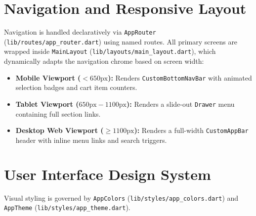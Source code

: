 \documentclass[11pt,a4paper]{article}
\begin{document}
\FloatBarrier

\section{Navigation and Responsive Layout}

Navigation is handled declaratively via \texttt{AppRouter} (\texttt{lib/\allowbreak routes/\allowbreak app\_router.dart}) using named routes. All primary screens are wrapped inside \texttt{MainLayout} (\texttt{lib/\allowbreak layouts/\allowbreak main\_layout.dart}), which dynamically adapts the navigation chrome based on screen width:

\begin{itemize}[leftmargin=*]
    \item \textbf{Mobile Viewport ($< 650\text{px}$):} Renders \texttt{CustomBottomNavBar} with animated selection badges and cart item counters.
    \item \textbf{Tablet Viewport ($650\text{px} - 1100\text{px}$):} Renders a slide-out \texttt{Drawer} menu containing full section links.
    \item \textbf{Desktop Web Viewport ($\ge 1100\text{px}$):} Renders a full-width \texttt{CustomAppBar} header with inline menu links and search triggers.
\end{itemize}

\FloatBarrier

\section{User Interface Design System}

Visual styling is governed by \texttt{AppColors} (\texttt{lib/\allowbreak styles/\allowbreak app\_colors.dart}) and \texttt{AppTheme} (\texttt{lib/\allowbreak styles/\allowbreak app\_theme.dart}).
\end{document}
